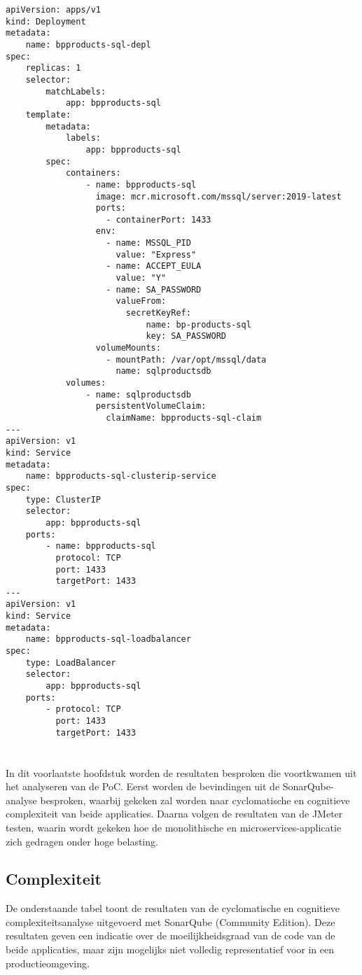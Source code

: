 \begin{lstlisting}[style=mystyleA, caption=bpproducts-sql-depl.yaml, label=lst:BPProductsSQLDepl]
apiVersion: apps/v1
kind: Deployment
metadata:
	name: bpproducts-sql-depl
spec:
	replicas: 1
	selector:
		matchLabels:
			app: bpproducts-sql
	template:
		metadata:
			labels:
				app: bpproducts-sql
		spec:
			containers:
				- name: bpproducts-sql
				  image: mcr.microsoft.com/mssql/server:2019-latest
				  ports:
					- containerPort: 1433
				  env:
					- name: MSSQL_PID
					  value: "Express"
					- name: ACCEPT_EULA
					  value: "Y"
					- name: SA_PASSWORD
					  valueFrom:
						secretKeyRef:
							name: bp-products-sql
							key: SA_PASSWORD
				  volumeMounts:
					- mountPath: /var/opt/mssql/data
					  name: sqlproductsdb
			volumes:
				- name: sqlproductsdb
				  persistentVolumeClaim:
					claimName: bpproducts-sql-claim
---
apiVersion: v1
kind: Service
metadata:
	name: bpproducts-sql-clusterip-service
spec:
	type: ClusterIP
	selector:
		app: bpproducts-sql
	ports:
		- name: bpproducts-sql
		  protocol: TCP
		  port: 1433
		  targetPort: 1433
---
apiVersion: v1
kind: Service
metadata:
	name: bpproducts-sql-loadbalancer
spec:
	type: LoadBalancer
	selector:
		app: bpproducts-sql
	ports:
		- protocol: TCP
		  port: 1433
		  targetPort: 1433
\end{lstlisting}




\chapter{}%
\label{ch:resultaten}

In dit voorlaatste hoofdstuk worden de resultaten besproken die voortkwamen uit het analyseren van de PoC. Eerst worden de bevindingen uit de SonarQube-analyse besproken, waarbij gekeken zal worden naar cyclomatische en cognitieve complexiteit van beide applicaties. Daarna volgen de resultaten van de JMeter testen, waarin wordt gekeken hoe de monolithische en microservices-applicatie zich gedragen onder hoge belasting.

\section{Complexiteit}

De onderstaande tabel toont de resultaten van de cyclomatische en cognitieve complexiteitsanalyse uitgevoerd met SonarQube (Community Edition). Deze resultaten geven een indicatie over de moeilijkheidsgraad van de code van de beide applicaties, maar zijn mogelijks niet volledig representatief voor in een productieomgeving.

